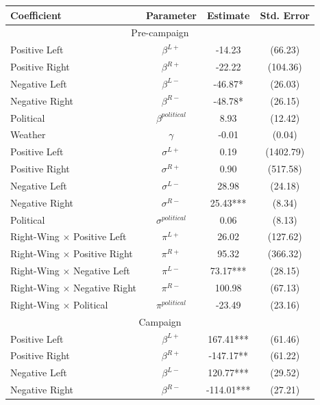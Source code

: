 \documentclass[12pt]{article}
\begin{document}
	\begin{table}[ht]
		\centering
		\begin{threeparttable}
			\begin{tabular}{lccc}
				\hline
				\textbf{Coefficient} & \textbf{Parameter} & \textbf{Estimate} & \textbf{Std. Error} \\
				\hline
				\multicolumn{4}{c}{Pre-campaign} \\
				\hline
				\hline
				Positive Left & $\beta^{L+}$ & -14.23 & (66.23) \\
				Positive Right & $\beta^{R+}$ & -22.22 & (104.36) \\
				Negative Left & $\beta^{L-}$ & -46.87* & (26.03) \\
				Negative Right & $\beta^{R-}$ & -48.78* & (26.15) \\
				Political & $\beta^{political}$ & 8.93 & (12.42) \\
				Weather & $\gamma$ & -0.01 & (0.04) \\
				\hline
				Positive Left & $\sigma^{L+}$ & 0.19 & (1402.79) \\
				Positive Right & $\sigma^{R+}$ & 0.90 & (517.58) \\
				Negative Left & $\sigma^{L-}$ & 28.98 & (24.18) \\
				Negative Right & $\sigma^{R-}$ & 25.43*** & (8.34) \\
				Political & $\sigma^{political}$ & 0.06 & (8.13) \\
				\hline
				Right-Wing $\times$  Positive Left & $\pi^{L+}$ & 26.02 & (127.62) \\
				Right-Wing $\times$  Positive Right & $\pi^{R+}$ & 95.32 & (366.32) \\
				Right-Wing $\times$  Negative Left & $\pi^{L-}$ & 73.17*** & (28.15) \\
				Right-Wing $\times$  Negative Right & $\pi^{R-}$ & 100.98 & (67.13) \\
				Right-Wing $\times$  Political & $\pi^{political}$ & -23.49 & (23.16) \\
				\hline
				\hline
				\multicolumn{4}{c}{Campaign} \\
				\hline
				\hline
				Positive Left & $\beta^{L+}$ & 167.41*** & (61.46) \\
				Positive Right & $\beta^{R+}$ & -147.17** & (61.22) \\
				Negative Left & $\beta^{L-}$ & 120.77*** & (29.52) \\
				Negative Right & $\beta^{R-}$ & -114.01*** & (27.21) \\

\end{tabular}
\end{threeparttable}
\end{table}
\end{document}
